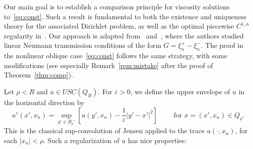 \documentclass[letter,11pt]{amsart}
\newcommand{\vep}{\varepsilon}
\newcommand{\uppers}{USC}
\theoremstyle{definition}
\numberwithin{equation}{section}
\begin{document}
\medskip

Our main goal is to establish a comparison principle for viscosity solutions to~\eqref{eq:const}.
Such a result is fundamental to both the existence and uniqueness theory for the associated Dirichlet problem, as well as the optimal piecewise $C^{1,\alpha}$ regularity in~\cite{E}. 
Our approach is adapted from~\cite[Section~3]{DFSfb,DFS} and~\cite[Section~4]{SS}, where the authors studied linear Neumann transmission conditions of the form $G = \xi^{+}_n - \xi^{-}_{n}$.
The proof in the nonlinear oblique case~\eqref{eq:const} follows the same strategy, with some modifications (see especially Remark~\ref{rem:mistake} after the proof of Theorem~\ref{thm:comp}).

\medskip

Let $\rho < R$ and $u \in \uppers(Q_R)$.
For $\vep > 0$, we define the upper envelope of $u$ in the horizontal direction by
\[
u^{\vep}(x', x_n) = \sup_{y' \in B_\rho'}\left[u(y', x_n) - \frac{1}{\vep} |y' -x'|^2\right] \qquad \text{ for } x= (x',x_n) \in Q_{\rho}.
\]
This is the classical sup-convolution of Jensen applied to the trace $u(\cdot, x_n)$, for each $|x_n| < \rho$.
Such a regularization of $u$ has nice properties:
\end{document}
